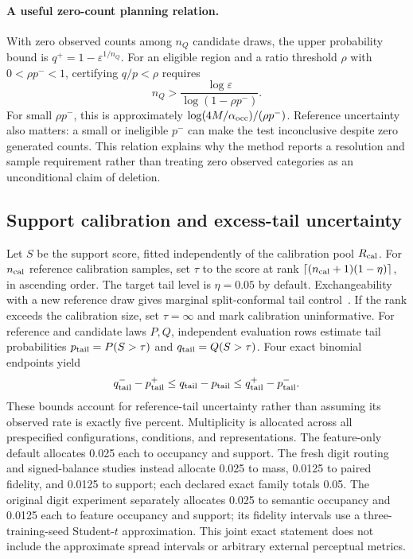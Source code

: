 \paragraph{A useful zero-count planning relation.}
With zero observed counts among $n_Q$ candidate draws, the upper
probability bound is $q^+=1-\varepsilon^{1/n_Q}$.
For an eligible region and a ratio threshold $\rho$ with
$0<\rho p^-<1$, certifying $q/p<\rho$ requires
\begin{equation}
n_Q>\frac{\log\varepsilon}{\log(1-\rho p^-)}.
\label{eq:zerocount}
\end{equation}
For small $\rho p^-$, this is approximately
$\log(4M/\alpha_{\rm occ})/(\rho p^-)$.
Reference uncertainty also matters: a small or ineligible $p^-$ can make the
test inconclusive despite zero generated counts. This relation explains why
the method reports a resolution and sample requirement rather than treating
zero observed categories as an unconditional claim of deletion.

\subsection{Support calibration and excess-tail uncertainty}
Let $S$ be the support score, fitted independently of the calibration
pool $R_{\rm cal}$. For $n_{\rm cal}$ reference calibration samples,
set $\tau$ to the score at rank $\lceil(n_{\rm cal}+1)(1-\eta)\rceil$,
in ascending order. The target tail level is $\eta=0.05$ by default.
Exchangeability with a new reference draw gives marginal split-conformal
tail control~\cite{vovk2013conditional}. If the rank exceeds the
calibration size, set $\tau=\infty$ and mark calibration uninformative.
For reference and candidate laws $P,Q$, independent evaluation rows
estimate tail probabilities $p_{\rm tail}=P(S>\tau)$ and
$q_{\rm tail}=Q(S>\tau)$.
Four exact binomial endpoints yield
\begin{equation}
q_{\rm tail}^- - p_{\rm tail}^+
\leq q_{\rm tail}-p_{\rm tail}
\leq q_{\rm tail}^+-p_{\rm tail}^-.
\label{eq:supp_tail_excess}
\end{equation}
These bounds account for reference-tail uncertainty rather than assuming its
observed rate is exactly five percent. Multiplicity is allocated across all
prespecified configurations, conditions, and representations. The feature-only
default allocates 0.025 each to occupancy and support. The fresh digit
routing and signed-balance studies instead allocate 0.025 to mass, 0.0125
to paired fidelity, and 0.0125 to support; each declared exact family totals
0.05. The original digit experiment separately allocates 0.025 to semantic
occupancy and 0.0125 each to feature occupancy and support; its fidelity
intervals use a three-training-seed Student-$t$ approximation.
This joint exact statement does not include the approximate spread intervals
or arbitrary external perceptual metrics.

